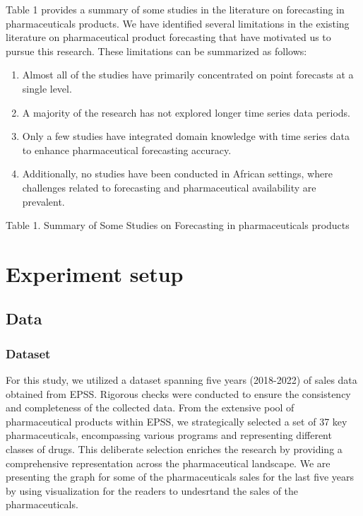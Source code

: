 \documentclass[
  authoryear,
  preprint,
  3p]{elsarticle}
\providecommand{\tightlist}{%
  \setlength{\itemsep}{0pt}\setlength{\parskip}{0pt}}\usepackage{longtable,booktabs,array}
\begin{document}
Table 1 provides a summary of some studies in the literature on
forecasting in pharmaceuticals products. We have identified several
limitations in the existing literature on pharmaceutical product
forecasting that have motivated us to pursue this research. These
limitations can be summarized as follows:

\begin{enumerate}
\def\labelenumi{\arabic{enumi}.}
\tightlist
\item
  Almost all of the studies have primarily concentrated on point
  forecasts at a single level.
\item
  A majority of the research has not explored longer time series data
  periods.
\item
  Only a few studies have integrated domain knowledge with time series
  data to enhance pharmaceutical forecasting accuracy.
\item
  Additionally, no studies have been conducted in African settings,
  where challenges related to forecasting and pharmaceutical
  availability are prevalent.
\end{enumerate}

Table 1. Summary of Some Studies on Forecasting in pharmaceuticals
products

\hypertarget{sec-experiment}{%
\section{Experiment setup}\label{sec-experiment}}

\hypertarget{sec-data}{%
\subsection{Data}\label{sec-data}}

\hypertarget{dataset}{%
\subsubsection{Dataset}\label{dataset}}

For this study, we utilized a dataset spanning five years (2018-2022) of
sales data obtained from EPSS. Rigorous checks were conducted to ensure
the consistency and completeness of the collected data. From the
extensive pool of pharmaceutical products within EPSS, we strategically
selected a set of 37 key pharmaceuticals, encompassing various programs
and representing different classes of drugs. This deliberate selection
enriches the research by providing a comprehensive representation across
the pharmaceutical landscape. We are presenting the graph for some of
the pharmaceuticals sales for the last five years by using visualization
for the readers to undesrtand the sales of the pharmaceuticals.
\end{document}
